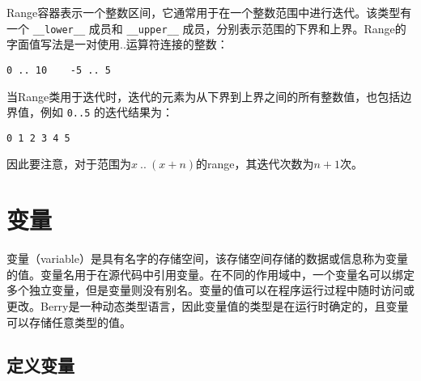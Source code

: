 Range容器表示一个整数区间，它通常用于在一个整数范围中进行迭代。该类型有一个 \texttt{\_\_lower\_\_} 成员和 \texttt{\_\_upper\_\_} 成员，分别表示范围的下界和上界。Range的字面值写法是一对使用..运算符连接的整数：
\begin{lstlisting}[language=berry, numbers=none]
0 .. 10    -5 .. 5
\end{lstlisting}

当Range类用于迭代时，迭代的元素为从下界到上界之间的所有整数值，也包括边界值，例如 \texttt{0..5} 的迭代结果为：
\begin{lstlisting}[language=berry, numbers=none]
0 1 2 3 4 5
\end{lstlisting}
因此要注意，对于范围为$x\ ..\ (x+n)$的range，其迭代次数为$n+1$次。

\section{变量}

变量（variable）是具有名字的存储空间，该存储空间存储的数据或信息称为变量的值。变量名用于在源代码中引用变量。在不同的作用域中，一个变量名可以绑定多个独立变量，但是变量则没有别名。变量的值可以在程序运行过程中随时访问或更改。Berry是一种动态类型语言，因此变量值的类型是在运行时确定的，且变量可以存储任意类型的值。

\subsection{定义变量}


